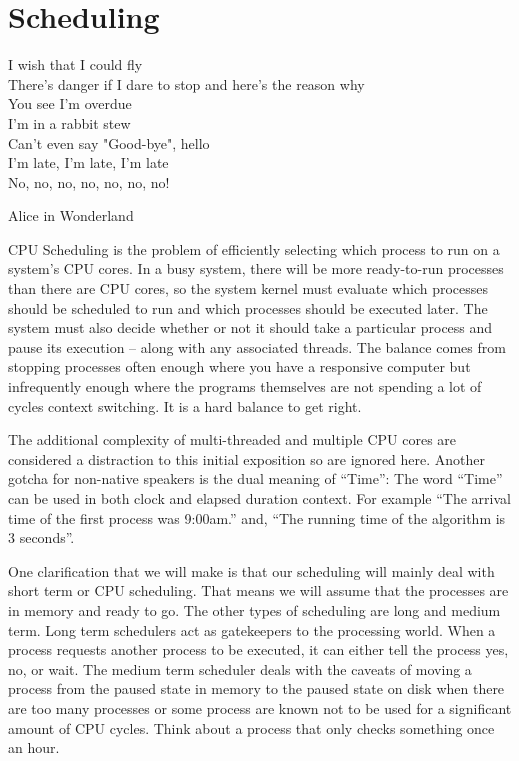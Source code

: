 \chapter{Scheduling}

\epigraph{I wish that I could fly\\
There's danger if I dare to stop and here's the reason why\\
You see I'm overdue\\
I'm in a rabbit stew\\
Can't even say "Good-bye", hello\\
I'm late, I'm late, I'm late\\
No, no, no, no, no, no, no!}{Alice in Wonderland}

CPU Scheduling is the problem of efficiently selecting which process to run on a system's CPU cores.
In a busy system, there will be more ready-to-run processes than there are CPU cores, so the system kernel must evaluate which processes should be scheduled to run and which processes should be executed later.
The system must also decide whether or not it should take a particular process and pause its execution -- along with any associated threads.
The balance comes from stopping processes often enough where you have a responsive computer but infrequently enough where the programs themselves are not spending a lot of cycles context switching.
It is a hard balance to get right.

The additional complexity of multi-threaded and multiple CPU cores are considered a distraction to this initial exposition so are ignored here.
Another gotcha for non-native speakers is the dual meaning of ``Time'': The word ``Time'' can be used in both clock and elapsed duration context.
For example ``The arrival time of the first process was 9:00am.'' and, ``The running time of the algorithm is 3 seconds''.

One clarification that we will make is that our scheduling will mainly deal with short term or CPU scheduling.
That means we will assume that the processes are in memory and ready to go.
The other types of scheduling are long and medium term.
Long term schedulers act as gatekeepers to the processing world.
When a process requests another process to be executed, it can either tell the process yes, no, or wait.
The medium term scheduler deals with the caveats of moving a process from the paused state in memory to the paused state on disk when there are too many processes or some process are known not to be used for a significant amount of CPU cycles.
Think about a process that only checks something once an hour.

